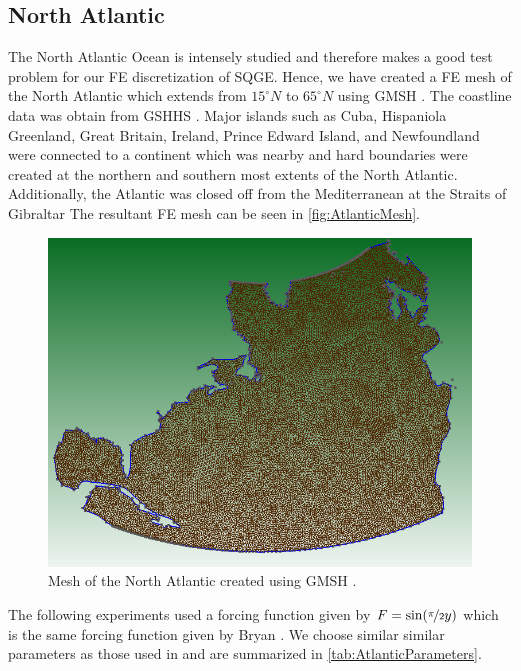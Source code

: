 \subsection{North Atlantic}
The North Atlantic Ocean is intensely studied\cite{Myers} and therefore makes a
good test problem for our FE discretization of SQGE. Hence, we have created a FE
mesh of the North Atlantic which extends from $15^\circ N$ to $65^\circ N$ using
GMSH \cite{GMSH}. The coastline data was obtain from GSHHS \cite{GSHHS}.  Major
islands such as Cuba, Hispaniola Greenland, Great Britain, Ireland, Prince
Edward Island, and Newfoundland were connected to a continent which was nearby
and hard boundaries were created at the northern and southern most extents of
the North Atlantic. Additionally, the Atlantic was closed off from the
Mediterranean at the Straits of Gibraltar The resultant FE mesh can be seen in
\autoref{fig:AtlanticMesh}.

\begin{figure}
  \begin{center}
    \includegraphics[scale=0.5]{Figures/NAMesh.png}
    \caption{Mesh of the North Atlantic created using GMSH \cite{GMSH}.}
    \label{fig:AtlanticMesh}
  \end{center}
\end{figure}

The following experiments used a forcing function given by $F =
\sin(\nicefrac{\pi}{2} y)$ which is the same forcing function given by Bryan
\cite{Bryan1963}. We choose similar similar parameters as those used in
\cite{delSastre04} and are summarized in \autoref{tab:AtlanticParameters}.

